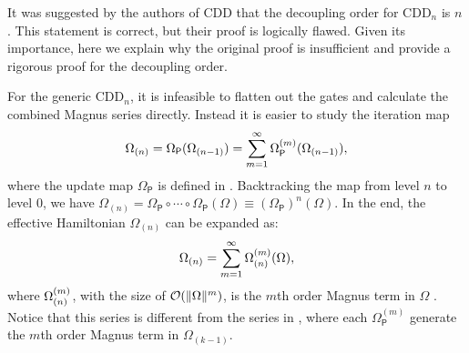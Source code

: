\documentclass[aps,pra,reprint,superscriptaddress]{revtex4-2}
\newcommand{\Opdd}{\Omega_{\mathsf{P}}}
\begin{document}
It was suggested by the authors of CDD that the decoupling order for $\mathrm{CDD}_n$  is $n$ \cite{khodjasteh2005fault}. This statement is correct, but their proof is logically flawed. Given its importance, here we explain why the original proof is insufficient and  provide a rigorous proof for the decoupling order.


For the generic $\mathrm{CDD}_n$, it is infeasible to flatten out the gates and calculate the combined Magnus series directly. 
Instead it is easier to study the iteration map 
\begin{equation}\label{eq:CDD-update}
    \Omega_{(n)} = \Opdd(\Omega_{(n-1)}) = \sum_{m=1}^\infty \Opdd\up{m}(\Omega_{(n-1)}),
\end{equation}
where the update map $\Opdd$ is defined in .
Backtracking the map from level $n$ to level $0$, we have
$\Omega_{(n)} = \Opdd\circ \cdots \circ \Opdd(\Omega)
\equiv(\Opdd)^n(\Omega)$.
In the end, the effective Hamiltonian $\Omega_{(n)}$ can be expanded as:
\begin{equation}\label{eq:CDD-magnus}
    \Omega_{(n)} =\sum_{m=1}^\infty \Omega_{(n)}^{(m)}(\Omega),
\end{equation}
where $\Omega_{(n)}^{(m)}$, with the size of  $\mathcal{O}(\Vert {\Omega} \Vert^m)$, is the $m$th order Magnus term in $\Omega$ . Notice that this series is different from the series in , where
each $\Opdd^{(m)}$ generate the $m$th order Magnus term in $\Omega_{(k-1)}$.
\end{document}
